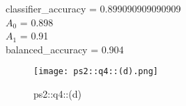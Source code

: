 \begin{answer}

classifier\_accuracy = 0.899090909090909 \\
$A_0$ = 0.898 \\ 
$A_1$ = 0.91 \\
balanced\_accuracy = 0.904 \\ 

\begin{figure}[H]
    \centering
    \texttt{[image: ps2::q4::(d).png]}
    \caption{ps2::q4::(d)}
    \label{fig:enter-label}
\end{figure}
\end{answer}